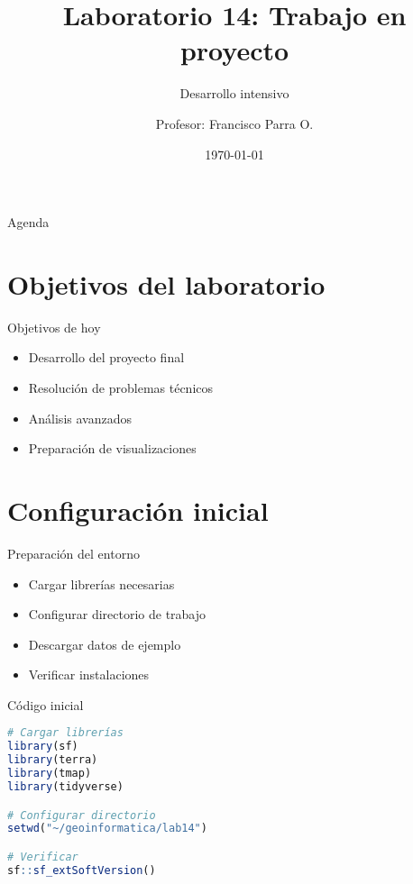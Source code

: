 \documentclass[10pt]{beamer}
\title{Laboratorio 14: Trabajo en proyecto}
\subtitle{Desarrollo intensivo}
\author{Profesor: Francisco Parra O.}
\institute{USACH - Ingeniería Civil en Informática}
\date{\today}
\begin{document}
\maketitle

\begin{frame}{Agenda}
    \tableofcontents
\end{frame}


\section{Objetivos del laboratorio}

\begin{frame}{Objetivos de hoy}
    \begin{itemize}
        \item Desarrollo del proyecto final
        \item Resolución de problemas técnicos
        \item Análisis avanzados
        \item Preparación de visualizaciones
    \end{itemize}
\end{frame}

\section{Configuración inicial}

\begin{frame}{Preparación del entorno}
    \begin{itemize}
        \item Cargar librerías necesarias
        \item Configurar directorio de trabajo
        \item Descargar datos de ejemplo
        \item Verificar instalaciones
    \end{itemize}
\end{frame}

\begin{frame}[fragile]{Código inicial}
    \begin{lstlisting}[language=R]
# Cargar librerías
library(sf)
library(terra)
library(tmap)
library(tidyverse)

# Configurar directorio
setwd("~/geoinformatica/lab14")

# Verificar
sf::sf_extSoftVersion()
    \end{lstlisting}
\end{frame}
\end{document}
